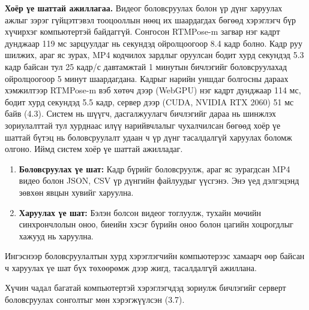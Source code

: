 \textbf{Хоёр үе шаттай ажиллагаа.} Видеог боловсруулах болон үр дүнг харуулах ажлыг зэрэг гүйцэтгэвэл тооцооллын нөөц их шаардагдах бөгөөд хэрэглэгч бүр хүчирхэг компьютертэй байдаггүй. Сонгосон RTMPose-m загвар нэг кадрт дунджаар 119 мс зарцуулдаг нь секундэд ойролцоогоор 8.4 кадр болно. Кадр руу шилжих, араг яс зурах, MP4 кодчилох зардлыг оруулсан бодит хурд секундэд 5.3 кадр байсан тул 25 кадр/с давтамжтай 1 минутын бичлэгийг боловсруулахад ойролцоогоор 5 минут шаардагдана. Кадрыг нарийн уншдаг болгосны дараах хэмжилтээр RTMPose-m вэб хөтөч дээр (WebGPU) нэг кадрт дунджаар 114 мс, бодит хурд секундэд 5.5 кадр, сервер дээр (CUDA, NVIDIA RTX 2060) 51 мс байв (4.3). Систем нь шүүгч, дасгалжуулагч бичлэгийг дараа нь шинжлэх зориулалттай тул хурднаас илүү нарийвчлалыг чухалчилсан бөгөөд хоёр үе шаттай бүтэц нь боловсруулалт удаан ч үр дүнг тасалдалгүй харуулах боломж олгоно. Иймд систем хоёр үе шаттай ажилладаг.

\begin{enumerate}
\def\labelenumi{\arabic{enumi}.}
\item
  \textbf{Боловсруулах үе шат:} Кадр бүрийг боловсруулж, араг яс зурагдсан MP4 видео болон JSON, CSV үр дүнгийн файлуудыг үүсгэнэ. Энэ үед дэлгэцэнд зөвхөн явцын хувийг харуулна.
\item
  \textbf{Харуулах үе шат:} Бэлэн болсон видеог тоглуулж, тухайн мөчийн синхрончлолын оноо, биеийн хэсэг бүрийн оноо болон цагийн хоцрогдлыг хажууд нь харуулна.
\end{enumerate}

Ингэснээр боловсруулалтын хурд хэрэглэгчийн компьютерээс хамаарч өөр байсан ч харуулах үе шат бүх төхөөрөмж дээр жигд, тасалдалгүй ажиллана.

Хүчин чадал багатай компьютертэй хэрэглэгчдэд зориулж бичлэгийг серверт боловсруулах сонголтыг мөн хэрэгжүүлсэн (3.7).

